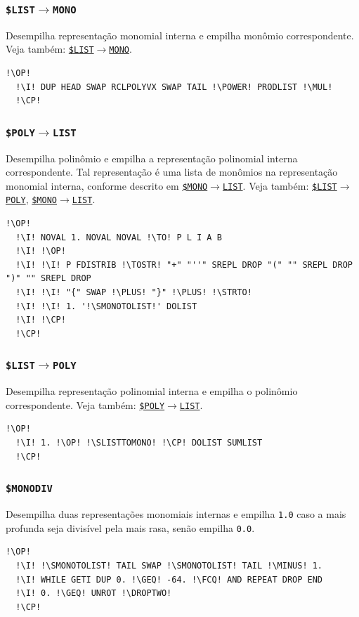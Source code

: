 \documentclass[12pt,a4paper]{report}
\newcommand{\kwd}[1]{\texttt{\textcolor{keyword}{#1}}}
\newcommand{\I}{\enspace\textcolor{indent}\vrule\hspace{2pt}}
\newcommand{\DROPTWO}{\kwd{DROP2}}   %
\newcommand{\GEQ}{\kwd{$\geq$}}   %
\newcommand{\PLUS}{\kwd{+}}   %
\newcommand{\MINUS}{\kwd{-}}   %
\newcommand{\MUL}{\kwd{*}}   %
\newcommand{\POWER}{\kwd{\^{}}}   %
\newcommand{\TOSTR}{\kwd{$\rightarrow$STR}}   %
\newcommand{\STRTO}{\kwd{STR$\rightarrow$}}   %
\newcommand{\FCQ}{\kwd{FC?}} %
\newcommand{\SPOLYTOLIST}{\kwd{\$POLY{$\rightarrow$}LIST}}   %
\newcommand{\SLISTTOPOLY}{\kwd{\$LIST{$\rightarrow$}POLY}}   %
\newcommand{\SLISTTOMONO}{\kwd{\$LIST{$\rightarrow$}MONO}}   %
\newcommand{\SMONOTOLIST}{\kwd{\$MONO{$\rightarrow$}LIST}}   %
\newcommand{\SMONODIV}{\kwd{\$MONODIV}}   %
\newcommand{\OP}{\kwd{$\ll$}}   %
\newcommand{\CP}{\kwd{$\gg$}}   %
\newcommand{\TO}{\kwd{$\rightarrow$}} %
\numberwithin{theorem}{chapter}
\begin{document}
\subsubsection{\SLISTTOMONO}\label{SLISTTOMONO}
Desempilha representação monomial interna e empilha monômio
correspondente.  Veja também: \hyperref[SLISTTOMONO]{\SLISTTOMONO}.
\begin{lstlisting}[language=userrpl]
  !\OP!
  !\I! DUP HEAD SWAP RCLPOLYVX SWAP TAIL !\POWER! PRODLIST !\MUL!
  !\CP!
\end{lstlisting}

\subsubsection{\SPOLYTOLIST}\label{SPOLYTOLIST}
Desempilha polinômio e empilha a representação polinomial interna
correspondente.  Tal representação é uma lista de monômios na
representação monomial interna, conforme descrito em
\hyperref[SMONOTOLIST]{\SMONOTOLIST}.  Veja também:
\hyperref[SLISTTOPOLY]{\SLISTTOPOLY},
\hyperref[SMONOTOLIST]{\SMONOTOLIST}.
\begin{lstlisting}[language=userrpl]
  !\OP!
  !\I! NOVAL 1. NOVAL NOVAL !\TO! P L I A B
  !\I! !\OP!
  !\I! !\I! P FDISTRIB !\TOSTR! "+" "''" SREPL DROP "(" "" SREPL DROP ")" "" SREPL DROP
  !\I! !\I! "{" SWAP !\PLUS! "}" !\PLUS! !\STRTO!
  !\I! !\I! 1. '!\SMONOTOLIST!' DOLIST
  !\I! !\CP!
  !\CP!
\end{lstlisting}

\subsubsection{\SLISTTOPOLY}\label{SLISTTOPOLY}
Desempilha representação polinomial interna e empilha o polinômio
correspondente.  Veja também: \hyperref[SPOLYTOLIST]{\SPOLYTOLIST}.
\begin{lstlisting}[language=userrpl]
  !\OP!
  !\I! 1. !\OP! !\SLISTTOMONO! !\CP! DOLIST SUMLIST
  !\CP!
\end{lstlisting}

\subsubsection{\SMONODIV}\label{SMONODIV}
Desempilha duas representações monomiais internas e empilha
\texttt{1.0} caso a mais profunda seja divisível pela mais rasa, senão
empilha \texttt{0.0}.
\begin{lstlisting}[language=userrpl]
  !\OP!
  !\I! !\SMONOTOLIST! TAIL SWAP !\SMONOTOLIST! TAIL !\MINUS! 1.
  !\I! WHILE GETI DUP 0. !\GEQ! -64. !\FCQ! AND REPEAT DROP END
  !\I! 0. !\GEQ! UNROT !\DROPTWO!
  !\CP!
\end{lstlisting}
\end{document}
